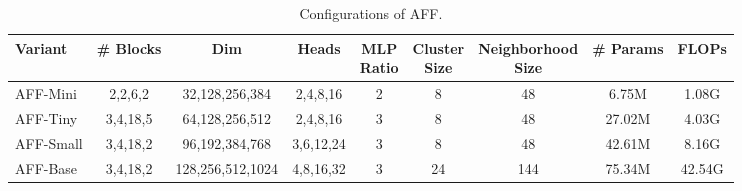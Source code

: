 \documentclass[10pt,twocolumn,letterpaper]{article}
\begin{document}
\begin{table*}
\begin{center}
\begin{small}
\begin{tabular}{lcccccccc}\hline
Variant & \# Blocks & Dim & Heads & \makecell{MLP\\Ratio} & \makecell{Cluster\\ Size} & \makecell{Neighborhood\\Size} & \# Params & FLOPs\\\hline
AFF-Mini & 2,2,6,2 & 32,128,256,384 & 2,4,8,16 & 2 & 8 & 48 & 6.75M & 1.08G \\
AFF-Tiny & 3,4,18,5 & 64,128,256,512 & 2,4,8,16 & 3 & 8 & 48 & 27.02M & 4.03G \\
AFF-Small & 3,4,18,2 & 96,192,384,768 & 3,6,12,24 & 3 & 8 & 48 & 42.61M & 8.16G \\
AFF-Base & 3,4,18,2 & 128,256,512,1024 & 4,8,16,32 & 3 & 24 & 144 & 75.34M & 42.54G \\\hline 
\end{tabular}
\end{small}
\end{center}
\vspace{-0.6cm}
\caption{Configurations of AFF.}
\label{tb:config}
\vskip -0.15in
\end{table*}
\end{document}
